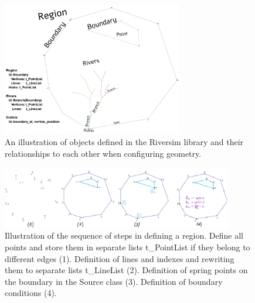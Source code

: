 \documentclass[]{pracamgr}
\begin{document}
      \begin{figure}[H]
        \centering
        \includegraphics[width=0.7\textwidth]{figs/GeometryClasses.jpg}
        \caption{An illustration of objects defined in the Riversim library and their relationships to each other when configuring geometry.}
        \label{GeometryClasses}
      \end{figure}

      \begin{figure}[H]
        \centering
        \includegraphics[width=0.9\textwidth]{figs/region_workflow.jpg}
        \caption{Illustration of the sequence of steps in defining a region. Define all points and store them in separate lists t\_PointList if they belong to different edges (1). Definition of lines and indexes and rewriting them to separate lists t\_LineList (2). Definition of spring points on the boundary in the Source class (3). Definition of boundary conditions (4).}
        \label{region_workflow}
      \end{figure}
\end{document}
